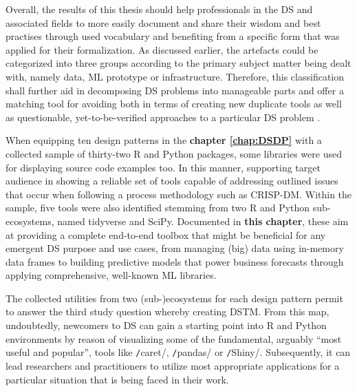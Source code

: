 Overall, the results of this thesis should help professionals in the \ac{DS} and associated fields to more easily document and share their wisdom and best practises through used vocabulary and benefiting from a specific form that was applied for their formalization. 
As discussed earlier, the artefacts could be categorized into three groups according to the primary subject matter being dealt with, namely data, \ac{ML} prototype or infrastructure. 
Therefore, this classification shall further aid in decomposing \ac{DS} problems into manageable parts and offer a matching tool for avoiding  both in terms of creating new duplicate tools as well as questionable, yet-to-be-verified approaches to a particular \ac{DS} problem \parencite[20]{FosterProvost2013DataThinking}.  

When equipping ten design patterns in the \textbf{chapter \ref{chap:DSDP}} with a collected sample of thirty-two R and Python packages, some libraries were used for displaying source code examples too. 
In this manner, supporting target audience in showing a reliable set of tools capable of addressing outlined issues that occur when following a process methodology such as \ac{CRISP-DM}.
Within the sample, five tools were also identified stemming from two R and Python sub-ecosystems, named tidyverse and SciPy.
Documented in \textbf{this chapter}, these aim at providing a complete end-to-end toolbox that might be beneficial for any emergent \ac{DS} purpose and use cases, from managing (big) data using in-memory data frames to building predictive models that power business forecasts through applying comprehensive, well-known \ac{ML} libraries.

The collected utilities from two (sub-)ecosystems for each design pattern permit to answer the third study question whereby creating \acl{DSTM}. 
From this map, undoubtedly, newcomers to \ac{DS} can gain a starting point into R and Python environments by reason of visualizing some of the fundamental, arguably \enquote{most useful and popular}, tools like \texttt/caret/, \texttt/pandas/ or \texttt/Shiny/.
Subsequently, it can lead researchers and practitioners to utilize most appropriate applications for a particular situation that is being faced in their work.

